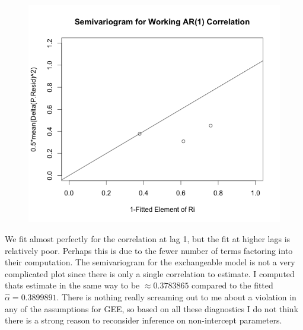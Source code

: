 \documentclass[11pt]{article}
\begin{document}
\begin{enumerate}
		\begin{figure}[H]
			\centering
			\includegraphics[scale=0.4]{RplotSemiVar.png}		
		\end{figure}
		We fit almost perfectly for the correlation at lag 1, but the fit at higher lags is relatively poor. Perhaps this is due to the fewer number of terms factoring into their computation. The semivariogram for the exchangeable model is not a very complicated plot since there is only a single correlation to estimate. I computed thats estimate in the same way to be $\approx 0.3783865$ compared to the fitted $\widehat\alpha = 0.3899891$. There is nothing really screaming out to me about a violation in any of the assumptions for GEE, so based on all these diagnostics I do not think there is a strong reason to reconsider inference on non-intercept parameters.


\end{enumerate}
\end{document}
